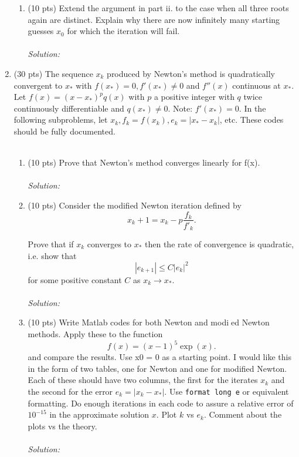 \documentclass{article}
\begin{document}
\begin{enumerate}
\begin{enumerate}[label=\roman*]
			
			\item (10 pts) Extend the argument in part ii. to the case when all three roots again are distinct. Explain why there are now infinitely many starting guesses $x_0$ for which the iteration will fail.\\
			\\
			\textit{Solution:}\\
			
			
		\end{enumerate}
		
		\item(30 pts) The sequence $x_k$ produced by Newton's method is quadratically convergent to $x_*$ with $f(x_*) = 0, f'(x_*) \neq 0$ and $f''(x)$ continuous at $x_*$.\\
		Let $f(x) = (x-x_*)^p q(x)$ with $p$ a positive integer with $q$ twice continuously differentiable and $q(x_*) \neq 0$. Note: $f'(x_*) = 0$. In the following subproblems, let $x_k, f_k = f(x_k), e_k = |x_*-x_k|$, etc. These codes should be fully documented.\\
		\\
		\begin{enumerate}[label=\roman*]
			\item (10 pts) Prove that Newton's method converges linearly for f(x).\\
			\\
			\textit{Solution:}\\
			
			
			\item (10 pts) Consider the modified Newton iteration defined by
			\[x_k+1 = x_k -p\frac{f_k}{f'_k}.\]
			
			Prove that if $x_k$ converges to $x_*$ then the rate of convergence is quadratic, i.e. show that
			\[|e_{k+1}| \leq C|e_k|^2\] 
			for some positive constant $C$ as $x_k\rightarrow x_*$.\\
			\\
			\textit{Solution:}\\
			
			
			\item (10 pts) Write Matlab codes for both Newton and modied Newton methods. Apply these to the function
			\[f(x) = (x-1)^5\exp(x).\]
			and compare the results. Use x0 = 0 as a starting point. I would like this in the form of two tables, one for Newton and one for modified Newton. Each of these should have two columns, the first for the iterates $x_k$ and the second for the error $e_k = |x_k-x_*|$. Use \verb|format long e| or equivalent formatting. Do enough iterations in each code to assure a relative error of $10^{-15}$ in the approximate solution $x$. Plot $k$ vs $e_k$. Comment about the plots vs the theory.\\
			\\
			\textit{Solution:}\\
			

\end{enumerate}
\end{enumerate}
\end{document}
